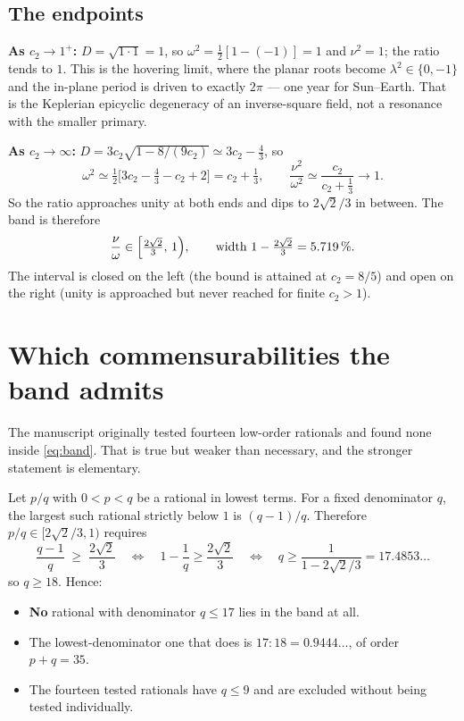 \documentclass[11pt,a4paper]{article}
\begin{document}
\subsection{The endpoints}

\textbf{As $c_2\to1^+$:} $D=\sqrt{1\cdot1}=1$, so
$\omega^2=\tfrac12[1-(-1)]=1$ and $\nu^2=1$; the ratio tends to $1$. This is
the hovering limit, where the planar roots become $\lambda^2\in\{0,-1\}$ and
the in-plane period is driven to exactly $2\pi$ --- one year for Sun--Earth.
That is the Keplerian epicyclic degeneracy of an inverse-square field, not a
resonance with the smaller primary.

\textbf{As $c_2\to\infty$:} $D=3c_2\sqrt{1-8/(9c_2)}\simeq3c_2-\tfrac43$, so
\begin{equation}
  \omega^2 \simeq \tfrac12\bigl[3c_2-\tfrac43-c_2+2\bigr] = c_2+\tfrac13,
  \qquad
  \frac{\nu^2}{\omega^2}\simeq\frac{c_2}{c_2+\tfrac13}\to1 .
\end{equation}
So the ratio approaches unity at both ends and dips to $2\sqrt2/3$ in between.
The band is therefore
\begin{equation}
  \frac{\nu}{\omega}\in\Bigl[\tfrac{2\sqrt2}{3},\,1\Bigr),
  \qquad \text{width } 1-\tfrac{2\sqrt2}{3}=\SI{5.719}{\percent} .
  \label{eq:band}
\end{equation}
The interval is closed on the left (the bound is attained at $c_2=8/5$) and
open on the right (unity is approached but never reached for finite $c_2>1$).

\section{Which commensurabilities the band admits}\label{sec:reso}

The manuscript originally tested fourteen low-order rationals and found none
inside \eqref{eq:band}. That is true but weaker than necessary, and the
stronger statement is elementary.

Let $p/q$ with $0<p<q$ be a rational in lowest terms. For a fixed denominator
$q$, the largest such rational strictly below $1$ is $(q-1)/q$. Therefore
$p/q\in[2\sqrt2/3,1)$ requires
\begin{equation}
  \frac{q-1}{q}\;\geq\;\frac{2\sqrt2}{3}
  \quad\Longleftrightarrow\quad
  1-\frac1q\geq\frac{2\sqrt2}{3}
  \quad\Longleftrightarrow\quad
  q \geq \frac{1}{1-2\sqrt2/3} = 17.4853\ldots
\end{equation}
so $q\geq18$. Hence:
\begin{itemize}
\item \textbf{No} rational with denominator $q\leq17$ lies in the band at all.
\item The lowest-denominator one that does is $17{:}18=0.9444\ldots$, of
      order $p+q=35$.
\item The fourteen tested rationals have $q\leq9$ and are excluded without
      being tested individually.
\end{itemize}
\end{document}

